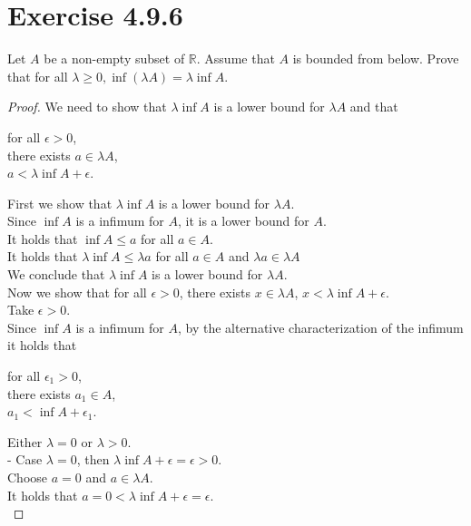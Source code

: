 \documentclass{article}
\theoremstyle{mytheoremstyle}
\theoremstyle{mytheoremstyle}
\theoremstyle{myproblemstyle}
\begin{document}
    \section{Exercise 4.9.6}
    \begin{problem}
        Let $A$ be a non-empty subset of $\mathbb{R}$. Assume that $A$ is bounded from below.
        Prove that for all $\lambda \ge 0, \inf(\lambda A) = \lambda \inf A$.
    \end{problem}
    \begin{proof}
        We need to show that $\lambda \inf A$ is a lower bound for $\lambda A$ and that
        \begin{center}
            for all $\epsilon > 0$, \\
            there exists $a \in \lambda A$, \\
            $a < \lambda \inf A + \epsilon$.
        \end{center}

        First we show that $\lambda \inf A$ is a lower bound for $\lambda A$. \\
        Since $\inf A$ is a infimum for $A$, it is a lower bound for $A$. \\
        It holds that $\inf A \le a$ for all $a \in A$. \\
        It holds that $\lambda \inf A \le \lambda a$ for all $a \in A$ and $\lambda a \in \lambda A$ \\
        We conclude that $\lambda \inf A$ is a lower bound for $\lambda A$. \\

        Now we show that for all $\epsilon > 0$, there exists $x \in \lambda A$, $x < \lambda \inf A + \epsilon$. \\
        Take $\epsilon > 0$. \\
        Since $\inf A$ is a infimum for $A$, by the alternative characterization of the infimum it holds that
        \begin{center}
            for all $\epsilon_1 > 0$, \\
            there exists $a_1 \in A$, \\
            $a_1 < \inf A + \epsilon_1$. \\
        \end{center}
        Either $\lambda = 0$ or $\lambda > 0$. \\

        - Case $\lambda = 0$, then $\lambda \inf A + \epsilon = \epsilon > 0$. \\
        Choose $a = 0$ and $a \in \lambda A$. \\
        It holds that $a = 0 < \lambda \inf A + \epsilon = \epsilon$. \\


\end{proof}
\end{document}
